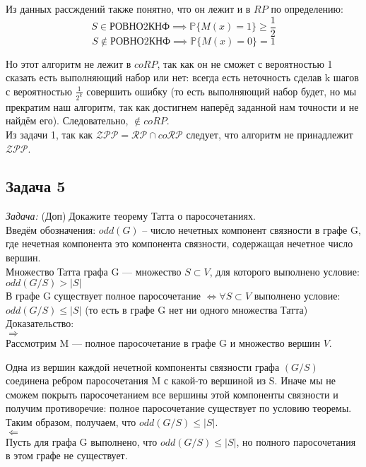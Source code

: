 \documentclass[a4paper,12pt]{article} %
\begin{document}
Из данных рассждений также понятно, что он лежит и в $ RP $ по определению:
\[
S \in \text{РОВНО2КНФ} \implies \mathbb{P}\{M(x)=1\} \geqslant \dfrac{1}{2}
\]
\[
S \not\in \text{РОВНО2КНФ} \implies \mathbb{P}\{M(x)=0\} = 1 
\]

Но этот алгоритм не лежит в $ coRP $, так как он не сможет с вероятностью 1 сказать есть выполняющий набор или нет: всегда есть неточность сделав k шагов с вероятностью $ \frac{1}{2^k} $ совершить ошибку (то есть выполняющий набор будет, но мы прекратим наш алгоритм, так как достигнем наперёд заданной нам точности и не найдём его). Следовательно, $ \notin coRP $.\\

Из задачи 1, так как $\mathcal{ZPP} = \mathcal{RP} \cap co\mathcal{RP}$ следует, что алгоритм не принадлежит $ \mathcal{ZPP} $.

\subsection*{Задача 5}
\textit{Задача:} (Доп)$\;$Докажите теорему Татта о паросочетаниях.\\

Введём обозначения: $ odd(G) $ -- число нечетных компонент связности в графе G, где нечетная компонента это компонента связности, содержащая нечетное число вершин.\\

Множество Татта графа G — множество $ S\subset V $, для которого выполнено условие: $odd(G/S)>|S|$\\

В графе G существует полное паросочетание $\Leftrightarrow \forall S \subset V$ выполнено условие: $odd(G/S)\leqslant|S|$ (то есть в графе G нет ни одного множества Татта)\\
Доказательство:\\
$ \Rightarrow $\\
Рассмотрим M — полное паросочетание в графе G и множество вершин $ V $.

Одна из вершин каждой нечетной компоненты связности графа $ (G/S)$ соединена ребром паросочетания M с какой-то вершиной из S. Иначе мы не сможем покрыть паросочетанием все вершины этой компоненты связности и получим противоречие: полное паросочетание существует по условию теоремы. Таким образом, получаем, что $odd(G/S)\leqslant|S|$.\\
$ \Leftarrow $\\
Пусть для графа G выполнено, что $odd(G/S)\leqslant|S|$, но полного паросочетания в этом графе не существует.\\
\end{document}
